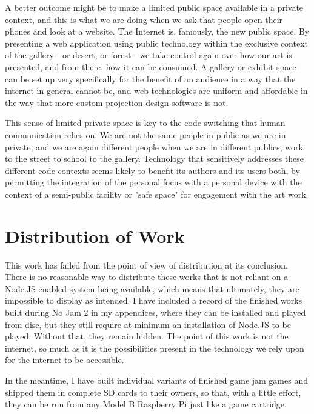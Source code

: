 A better outcome might be to make a limited public space available in a private context, and this is what we are doing when we ask that people open their phones and look at a website. The Internet is, famously, the new public space. By presenting a web application using public technology within the exclusive context of the gallery - or desert, or forest - we take control again over how our art is presented, and from there, how it can be consumed. A gallery or exhibit space can be set up very specifically for the benefit of an audience in a way that the internet in general cannot be, and web technologies are uniform and affordable in the way that more custom projection design software is not.

This sense of limited private space is key to the code-switching that human communication relies on. We are not the same people in public as we are in private, and we are again different people when we are in different publics, work to the street to school to the gallery. Technology that sensitively addresses these different code contexts seems likely to benefit its authors and its users both, by permitting the integration of the personal focus with a personal device with the context of a semi-public facility or "safe space" for engagement with the art work.

\section{Distribution of Work}

This work has failed from the point of view of distribution at its conclusion. There is no reasonable way to distribute these works that is not reliant on a Node.JS enabled system being available, which means that ultimately, they are impossible to display as intended. I have included a record of the finished works built during No Jam 2 in my appendices, where they can be installed and played from disc, but they still require at minimum an installation of Node.JS to be played. Without that, they remain hidden. The point of this work is not the internet, so much as it is the possibilities present in the technology we rely upon for the internet to be accessible.

In the meantime, I have built individual variants of finished game jam games and shipped them in complete SD cards to their owners, so that, with a little effort, they can be run from any Model B Raspberry Pi just like a game cartridge.